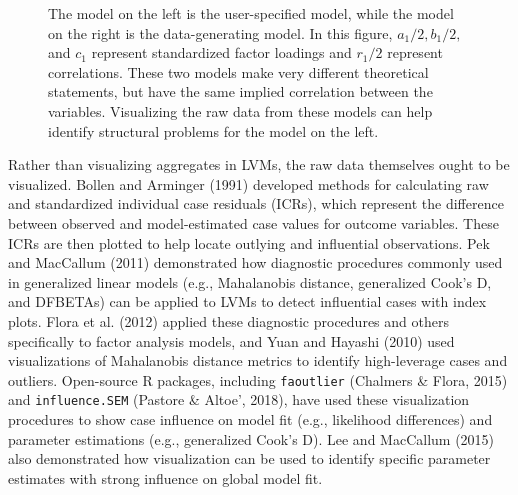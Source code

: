 \documentclass[
  english,
  man]{apa6}
\begin{document}
\begin{figure}
\begin{center}
\caption{The model on the left is the user-specified model, while the model on the right is the data-generating model. In this figure, $a_1/2, b_1/2,$ and $c_1$ represent standardized factor loadings and $r_1/2$ represent correlations. These two models make very different theoretical statements, but have the same implied correlation between the variables. Visualizing the raw data from these models can help identify structural problems for the model on the left.}
\label{fig:implied}
\end{center}
\end{figure}

Rather than visualizing aggregates in LVMs, the raw data themselves ought to be visualized. Bollen and Arminger (1991) developed methods for calculating raw and standardized individual case residuals (ICRs), which represent the difference between observed and model-estimated case values for outcome variables. These ICRs are then plotted to help locate outlying and influential observations. Pek and MacCallum (2011) demonstrated how diagnostic procedures commonly used in generalized linear models (e.g., Mahalanobis distance, generalized Cook's D, and DFBETAs) can be applied to LVMs to detect influential cases with index plots. Flora et al. (2012) applied these diagnostic procedures and others specifically to factor analysis models, and Yuan and Hayashi (2010) used visualizations of Mahalanobis distance metrics to identify high-leverage cases and outliers. Open-source R packages, including \texttt{faoutlier} (Chalmers \& Flora, 2015) and \texttt{influence.SEM} (Pastore \& Altoe', 2018), have used these visualization procedures to show case influence on model fit (e.g., likelihood differences) and parameter estimations (e.g., generalized Cook's D). Lee and MacCallum (2015) also demonstrated how visualization can be used to identify specific parameter estimates with strong influence on global model fit.
\end{document}
